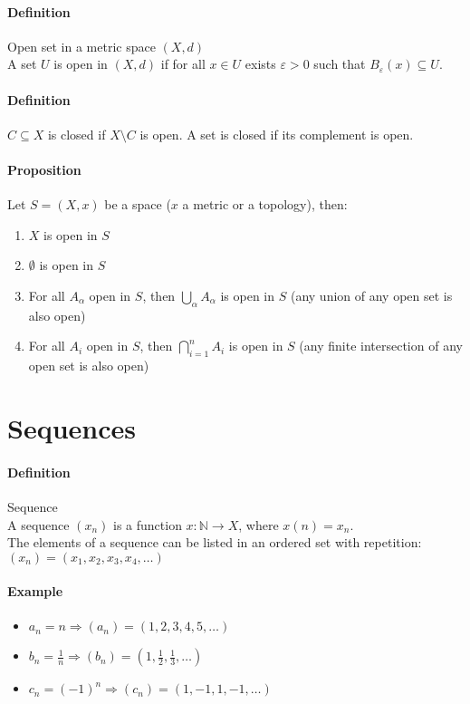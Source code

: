 \documentclass{article}
\newcommand{\func}[3]{#1 : #2 \rightarrow #3}
\newcommand{\N}{\mathbb{N}}
\newcommand{\Ep}{\varepsilon}
\newcommand{\Def}{\paragraph{Definition}}
\newcommand{\Proposition}{\paragraph{Proposition}}
\newcommand{\Example}{\paragraph{Example}}
\begin{document}
	\Def Open set in a metric space $(X, d)$
\\A set $U$ is open in $(X, d)$ if for all $x \in U$ exists $\Ep > 0$ such
	that $B_\Ep(x) \subseteq U$.

	\Def $C \subseteq X$ is closed if $X\setminus C$ is open. A set is closed if
	its complement is open.

	\Proposition Let $S = (X, x)$ be a space ($x$ a metric or a topology), then:
	\begin{enumerate}[label=(\roman*)]
		\item $X$ is open in $S$
		\item $\emptyset$ is open in $S$
		\item For all $A_\alpha$ open in $S$, then $\displaystyle \bigcup_\alpha
		A_\alpha$ is open in $S$ (any union of any open set is also open)
		\item For all $A_i$ open in $S$, then $\displaystyle \bigcap_{i=1}^n
		A_i$ is open in $S$ (any finite intersection of any open set is also open)
	\end{enumerate}



\section{Sequences}

	\Def Sequence
\\A sequence $(x_n)$ is a function $\func{x}{\N}{X}$, where $x(n) = x_n$.
\\The elements of a sequence can be listed in an ordered set with repetition:
	$(x_n) = (x_1, x_2, x_3, x_4, \hdots)$

	\Example
	\begin{itemize}
		\item $a_n = n \Rightarrow (a_n) = (1, 2, 3, 4, 5, \hdots)$
		\item $b_n = \frac{1}{n} \Rightarrow (b_n) = (1, \frac{1}{2}, \frac{1}{3},
		\hdots)$
		\item $c_n = (-1)^n \Rightarrow (c_n) = (1, -1, 1, -1, \hdots)$
	\end{itemize}
\end{document}
